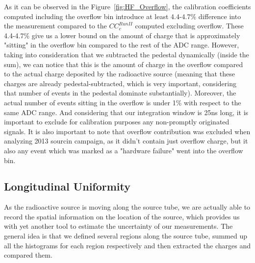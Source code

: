 As it can be observed in the Figure~\ref{fig:HF_Overflow}, the calibration
coefficients computed including the overflow bin introduce at least 4.4-4.7\%
difference into the measurement compared to the ${CC}^{Run II}_{c}$ computed
excluding overflow. These 4.4-4.7\% give us a lower bound on the amount of charge
that is approximately "sitting" in the overflow bin compared to the rest of the
ADC range. However, taking into consideration that we subtracted the pedestal
dynamically (inside the sum), we can notice that this is the amount of charge in
the overflow compared to the actual charge deposited by the radioactive source
(meaning that these charges are already pedestal-subtracted, which is very
important, considering that number of events in the pedestal dominate substantially).
Moreover, the actual number of events sitting in the overflow is under 1\% with
respect to the same ADC range. And considering that our integration window is
25\unit{ns} long, it is important to exclude for calibration purposes any
non-promptly originated signals.
It is also important to note that overflow contribution was excluded when analyzing 2013 sourcin campaign, as it didn't contain just overflow charge, but it also any event which was marked as a "hardware failure" went into the overflow bin.

\subsection{Longitudinal Uniformity}
As the radioactive source is moving along the source tube, we are actually able to record the spatial information on the location of the source, which provides us with yet another tool to estimate the uncertainty of our measurements. The general idea is that we defined several regions along the source tube, summed up all the histograms for each region respectively and then extracted the charges and compared them.
\begin{table}[!h] \centering {}
    \caption{Source tube regions defined to provide a measure of uncertainty on
    the charge deposited in various regions along the source tube}
    \label{tab:TubeRegions}
\end{table}

